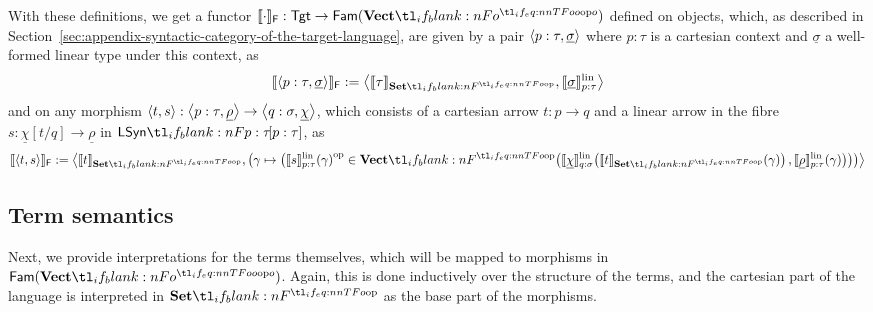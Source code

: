\documentclass[11pt,a4paper]{article}
\theoremstyle{definition}
\theoremstyle{remark}
\providecommand{\Fam}[1]{\mathsf{Fam}(#1)}
\providecommand{\casubst}[3]{#1[#3/#2]}
\providecommand{\lintype}[1]{\underline{#1}}
\providecommand{\setint}[1]{\llbracket #1\rrbracket_{\Set}}
\providecommand{\fvoint}[1]{\llbracket #1\rrbracket_{\cat[]{F}}}
\providecommand{\linint}[2]{\llbracket #1\rrbracket_{#2}^{\mathrm{lin}}}
\providecommand{\Tgt}{\mathsf{Tgt}}
\begin{document}
With these definitions, we get a functor \( \fvoint{\cdot}: \Tgt \to \Fam{\Vect[o]} \) defined on objects, which, as described in Section~\ref{sec:appendix-syntactic-category-of-the-target-language}, are given by a pair \( \tuple{ p : \tau, \lintype{\sigma} } \) where \( p : \tau \) is a cartesian context and \( \lintype{\sigma} \) a well-formed linear type under this context, as
\begin{equation}
  \label{eq:appendix-target-language-interpretation-functor-on-objects}
  \fvoint{\tuple{ p : \tau, \lintype{\sigma} }} :=
  \tuple{
    \setint{\tau},
    \linint{\lintype{\sigma}}{p : \tau}
  }
\end{equation}
and on any morphism \( \tuple{ t, s }: \tuple{ p : \tau, \lintype{\rho} } \to \tuple{ q : \sigma, \lintype{\chi} } \), which consists of a cartesian arrow \( t : p \to q \) and a linear arrow in the fibre \( s: \casubst{\lintype{\chi}}{q}{t} \to \lintype{\rho} \) in \( \LSyn[ p : \tau ] \), as
\begin{equation}
  \label{eq:appendix-target-language-fam-vectop-interpretation-morphisms}
  \fvoint{\tuple{ t, s }} :=
  \tuple{
    \setint{t},
    \left(
      \gamma \mapsto
      \left(
        \opmor[p]{
          \fn[n]{ \linint{s}{p : \tau} }{ \gamma }
        }
        \in
        \fn[n]{ \Vect }{
          \fn[n]{ \linint{\lintype{\chi}}{q : \sigma} }{ \fn[n]{ \setint{t} }{ \gamma } },
          \fn[n]{ \linint{\lintype{\rho}}{p : \tau} }{ \gamma }
        }
      \right) 
    \right) 
  }
\end{equation}

\subsection{Term semantics}

Next, we provide interpretations for the terms themselves, which will be mapped to morphisms in \( \Fam{\Vect[o]} \). Again, this is done inductively over the structure of the terms, and the cartesian part of the language is interpreted in \( \Set \) as the base part of the morphisms.
\end{document}
